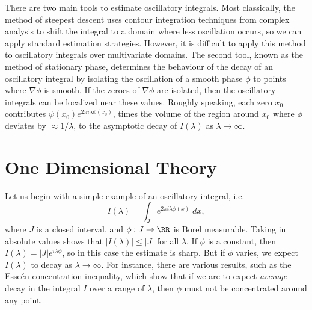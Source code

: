 There are two main tools to estimate oscillatory integrals. Most classically, the method of steepest descent uses contour integration techniques from complex analysis to shift the integral to a domain where less oscillation occurs, so we can apply standard estimation strategies. However, it is difficult to apply this method to oscillatory integrals over multivariate domains. The second tool, known as the method of stationary phase, determines the behaviour of the decay of an oscillatory integral by isolating the oscillation of a smooth phase $\phi$ to points where $\nabla \phi$ is smooth. If the zeroes of $\nabla \phi$ are isolated, then the oscillatory integrals can be localized near these values. Roughly speaking, each zero $x_0$ contributes $\psi(x_0) e^{2 \pi i \lambda \phi(x_0)}$, times the volume of the region around $x_0$ where $\phi$ deviates by $\approx 1/\lambda$, to the asymptotic decay of $I(\lambda)$ as $\lambda \to \infty$.

\section{One Dimensional Theory}

Let us begin with a simple example of an oscillatory integral, i.e.
%
\[ I(\lambda) = \int_J e^{2 \pi i \lambda \phi(x)}\; dx, \]
%
where $J$ is a closed interval, and $\phi: J \to \RR$ is Borel measurable. Taking in absolute values shows that $|I(\lambda)| \leq |J|$ for all $\lambda$. If $\phi$ is a constant, then $I(\lambda) = |J| e^{i \lambda \phi}$, so in this case the estimate is sharp. But if $\phi$ varies, we expect $I(\lambda)$ to decay as $\lambda \to \infty$. For instance, there are various results, such as the Esse\'{e}n concentration inequality, which show that if we are to expect \emph{average} decay in the integral $I$ over a range of $\lambda$, then $\phi$ must not be concentrated around any point.

